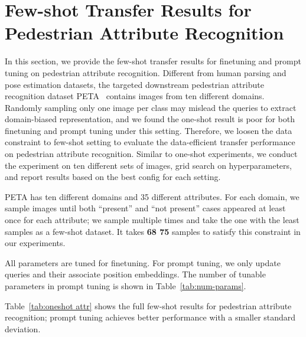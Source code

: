 \documentclass[10pt,twocolumn,letterpaper]{article}
\begin{document}
\section{Few-shot Transfer Results for Pedestrian Attribute Recognition}
In this section, we provide the few-shot transfer results for  finetuning and prompt tuning on pedestrian attribute recognition.
Different from human parsing and pose estimation datasets, the targeted downstream pedestrian attribute recognition dataset PETA~\cite{deng2014pedestrian} contains images from ten different domains. Randomly sampling only one image per class may mislead the queries to extract domain-biased representation, and we found the one-shot result is poor for both finetuning and prompt tuning under this setting. 
Therefore, we loosen the data constraint to few-shot setting to evaluate the data-efficient transfer performance on pedestrian attribute recognition.
Similar to one-shot experiments, we conduct the experiment on ten different sets of images, grid search on hyperparameters, and report results based on the best config for each setting.

 PETA has ten different domains and 35 different attributes. For each domain, we sample images until both ``present'' and ``not present'' cases appeared at least once for each attribute; we sample multiple times and take the one with the least samples as a few-shot dataset. It takes \textbf{68  75} samples to satisfy this constraint in our experiments.

 All parameters are tuned for finetuning. For prompt tuning, we only update queries and their associate position embeddings. The number of tunable parameters in prompt tuning is shown in Table~\ref{tab:num-params}.


 Table~\ref{tab:oneshot attr} shows the full few-shot results for pedestrian attribute recognition; prompt tuning achieves better performance with a smaller standard deviation. \begin{table}[htbp]
  \centering
  \caption{Few-shot pedestrian attribute recognition results on PETA, evaluated by mA. FT - finetuning, PT - prompt tuning.}
\end{table}
\end{document}
